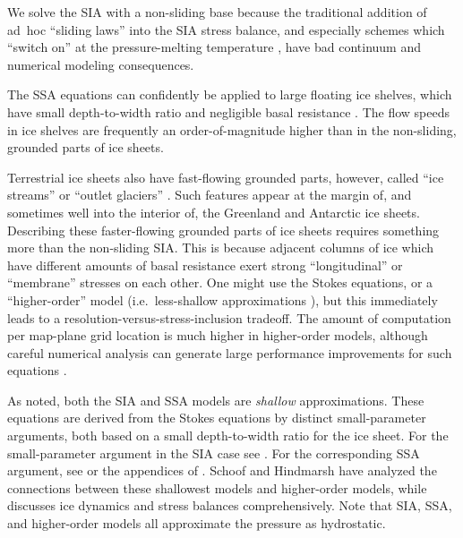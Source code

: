 We solve the SIA with a non-sliding base because the traditional \cite{Greve,HuybrechtsdeWolde,PayneBaldwin} addition of ad~hoc ``sliding laws'' into the SIA stress balance, and especially schemes which ``switch on'' at the pressure-melting temperature \cite{EISMINT00}, have bad continuum  \cite{Fowler01} and numerical \cite[appendix B]{BBssasliding} modeling consequences.

The SSA equations can confidently be applied to large floating ice shelves, which have small depth-to-width ratio and negligible basal resistance \cite{Morland,MorlandZainuddin}.  The flow speeds in ice shelves are frequently an order-of-magnitude higher than in the non-sliding, grounded parts of ice sheets.

Terrestrial ice sheets also have fast-flowing grounded parts, however, called ``ice streams'' or ``outlet glaciers'' \cite{TrufferEchelmeyer}.  Such features appear at the margin of, and sometimes well into the interior of, the Greenland \cite{Joughinetal2001} and Antarctic \cite{BamberVaughanJoughin} ice sheets.  Describing these faster-flowing grounded parts of ice sheets requires something more than the non-sliding SIA.  This is because adjacent columns of ice which have different amounts of basal resistance exert strong ``longitudinal'' or ``membrane'' stresses \cite{SchoofStream} on each other.  One might use the Stokes equations, or a ``higher-order'' model (i.e.~less-shallow approximations \cite{Blatter,Pattyn03}), but this immediately leads to a resolution-versus-stress-inclusion tradeoff.  The amount of computation per map-plane grid location is much higher in higher-order models, although careful numerical analysis can generate large performance improvements for such equations \cite{BrownSmithAhmadia2013}.

As noted, both the SIA and SSA models are \emph{shallow} approximations.  These equations are derived from the Stokes equations by distinct small-parameter arguments, both based on a small depth-to-width ratio for the ice sheet.  For the small-parameter argument in the SIA case see \cite{Fowler}.  For the corresponding SSA argument, see \cite{WeisGreveHutter} or the appendices of \cite{SchoofStream}.  Schoof and Hindmarsh \cite{SchoofHindmarsh} have analyzed the connections between these shallowest models and higher-order models, while \cite{GreveBlatter2009} discusses ice dynamics and stress balances comprehensively.  Note that SIA, SSA, and higher-order models all approximate the pressure as hydrostatic.

